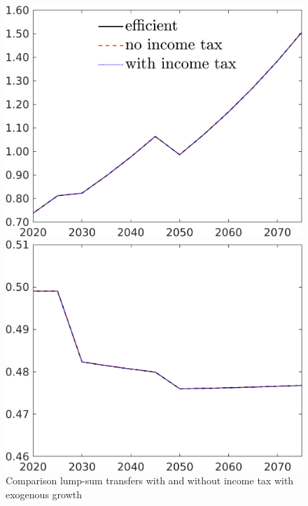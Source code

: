 \begin{figure}[h!!]
	\centering
	\caption{Comparison lump-sum transfers with and without income tax with exogenous growth}\label{fig:lumpsum_xgr_vglNotaul}
	
	\begin{minipage}[]{0.32\textwidth}
		\includegraphics[width=1\textwidth]{../../codding_model/own_basedOnFried/optimalPol_190722_tidiedUp/figures/all_July22/C_DDCompEffOPT_T_NoTaus_pol4_spillover0_noskill0_sep1_xgrowth1_etaa0.79_lgd1_lff0.png}
	\end{minipage}
	\begin{minipage}[]{0.32\textwidth}
		\includegraphics[width=1\textwidth]{../../codding_model/own_basedOnFried/optimalPol_190722_tidiedUp/figures/all_July22/hh_DDCompEffOPT_T_NoTaus_pol4_spillover0_noskill0_sep1_xgrowth1_etaa0.79_lgd0_lff0.png}

\end{minipage}
\end{figure}
